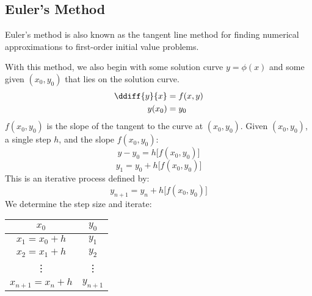 \documentclass{math}
\begin{document}
\subsection*{Euler's Method}
Euler's method is also known as the tangent line method for finding numerical
approximations to first-order initial value problems.
\begin{center}
\end{center}
With this method, we also begin with some solution curve \( y = \phi(x) \) and
some given \( (x_0,y_0) \) that lies on the solution curve.
\begin{align*}
  \ddiff{y}{x} &= f(x,y) \\
  y(x_0) &= y_0
\end{align*}
\( f(x_0,y_0) \) is the slope of the tangent to the curve at \( (x_0,y_0) \).
Given \( (x_0,y_0) \), a single step \( h \), and the slope \( f(x_0,y_0) \):
\[ y-y_0 = h\big[f(x_0,y_0)\big] \]
\[ y_1 = y_0+h\big[f(x_0,y_0)\big] \]
This is an iterative process defined by:
\[ y_{n+1} = y_n+h\big[f(x_0,y_0)\big] \]
We determine the step size and iterate:
\begin{center}
  \begin{tabular}{|c|c|}
    \hline
    \( x_0 \) & \( y_0 \) \\
    \hline
    \( x_1 = x_0+h \) & \( y_1 \) \\
    \hline
    \( x_2 = x_1+h \) & \( y_2 \) \\
    \hline
    \vdots & \vdots \\
    \hline
    \( x_{n+1} = x_n+h \) & \( y_{n+1} \) \\
    \hline
  \end{tabular}
\end{center}
\end{document}
